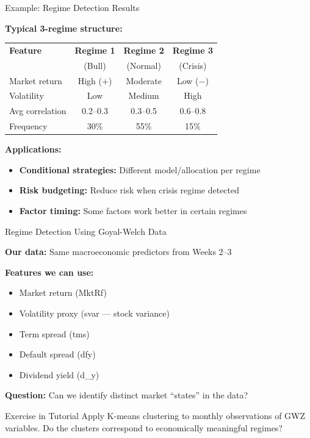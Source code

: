 \documentclass[10pt]{beamer}
\begin{document}
\begin{frame}{Example: Regime Detection Results}

  \textbf{Typical 3-regime structure:}

  \vspace{0.5em}
  \begin{center}
  \begin{tabular}{lccc}
    \toprule
    \textbf{Feature} & \textbf{Regime 1} & \textbf{Regime 2} & \textbf{Regime 3} \\
    & (Bull) & (Normal) & (Crisis) \\
    \midrule
    Market return & High (+) & Moderate & Low ($-$) \\
    Volatility & Low & Medium & High \\
    Avg correlation & 0.2--0.3 & 0.3--0.5 & 0.6--0.8 \\
    Frequency & 30\% & 55\% & 15\% \\
    \bottomrule
  \end{tabular}
  \end{center}

  \vspace{1em}
  \textbf{Applications:}
  \begin{itemize}
    \item \textbf{Conditional strategies:} Different model/allocation per regime
    \item \textbf{Risk budgeting:} Reduce risk when crisis regime detected
    \item \textbf{Factor timing:} Some factors work better in certain regimes
  \end{itemize}
\end{frame}


\begin{frame}{Regime Detection Using Goyal-Welch Data}

  \textbf{Our data:} Same macroeconomic predictors from Weeks 2--3

  \vspace{0.5em}
  \textbf{Features we can use:}
  \begin{itemize}
    \item Market return (MktRf)
    \item Volatility proxy (svar --- stock variance)
    \item Term spread (tms)
    \item Default spread (dfy)
    \item Dividend yield (d\_y)
  \end{itemize}

  \vspace{0.5em}
  \textbf{Question:} Can we identify distinct market ``states'' in the data?

  \vspace{0.5em}
  \begin{block}{Exercise in Tutorial}
    Apply K-means clustering to monthly observations of GWZ variables. Do the clusters correspond to economically meaningful regimes?
  \end{block}
\end{frame}
\end{document}
